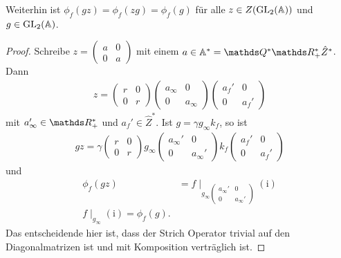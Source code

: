 \begin{prop}
Weiterhin ist $\phi_f(gz)=\phi_f(zg)=\phi_f(g)$ für alle $z \in Z(\operatorname{GL}_2(\mathbb{A}))$ und $g \in \operatorname{GL}_2(\mathbb{A})$.
\end{prop}
\begin{proof}
Schreibe $z=\begin{pmatrix}
a &0\\
0 &a
\end{pmatrix}$ mit einem $a \in \A^\ast=\Q^\ast \R_+^\ast \hat{Z}^\ast$.
Dann
\begin{align*}
z=\begin{pmatrix}
r &0\\
0 &r
\end{pmatrix}
\begin{pmatrix}
a_\infty &0\\
0 &a_\infty
\end{pmatrix}
\begin{pmatrix}
a_f' &0\\
0 & a_f'
\end{pmatrix}
\end{align*}
mit $a_\infty' \in \R_+^\ast$ und $a_f' \in \hat{Z}^\ast$.
Ist $g=\gamma g_\infty k_f$, so ist
\begin{align*}
gz= \gamma \begin{pmatrix}
r &0\\
0 &r
\end{pmatrix}
g_\infty
\begin{pmatrix}
a_\infty' &0 \\
0 &a_\infty'
\end{pmatrix}
k_f
\begin{pmatrix}
a_f' &0 \\
0 &a_f'
\end{pmatrix}
\end{align*}
und
\begin{align*}
\phi_f(gz)&=f\mid_{g_\infty \begin{pmatrix}
a_\infty' &0 \\
0 &a_\infty'
\end{pmatrix}} (\mathrm{i})\\
f\mid_{g_\infty}(\mathrm{i})=\phi_f(g).
\end{align*}
Das entscheidende hier ist, dass der Strich Operator trivial auf den Diagonalmatrizen ist und mit Komposition verträglich ist.
\end{proof}

